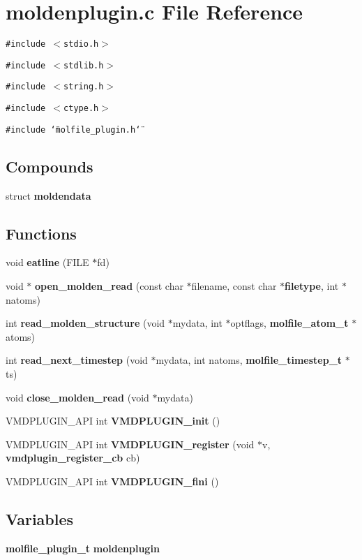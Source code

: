 \section{moldenplugin.c File Reference}
\label{moldenplugin_8c}
{\tt \#include $<$stdio.h$>$}\par
{\tt \#include $<$stdlib.h$>$}\par
{\tt \#include $<$string.h$>$}\par
{\tt \#include $<$ctype.h$>$}\par
{\tt \#include \char`\"{}molfile\_\-plugin.h\char`\"{}}\par
\subsection*{Compounds}
\begin{CompactItemize}
\item 
struct {\bf moldendata}
\end{CompactItemize}
\subsection*{Functions}
\begin{CompactItemize}
\item 
void {\bf eatline} (FILE $\ast$fd)
\item 
void $\ast$ {\bf open\_\-molden\_\-read} (const char $\ast$filename, const char $\ast${\bf filetype}, int $\ast$natoms)
\item 
int {\bf read\_\-molden\_\-structure} (void $\ast$mydata, int $\ast$optflags, {\bf molfile\_\-atom\_\-t} $\ast$atoms)
\item 
int {\bf read\_\-next\_\-timestep} (void $\ast$mydata, int natoms, {\bf molfile\_\-timestep\_\-t} $\ast$ts)
\item 
void {\bf close\_\-molden\_\-read} (void $\ast$mydata)
\item 
VMDPLUGIN\_\-API int {\bf VMDPLUGIN\_\-init} ()
\item 
VMDPLUGIN\_\-API int {\bf VMDPLUGIN\_\-register} (void $\ast$v, {\bf vmdplugin\_\-register\_\-cb} cb)
\item 
VMDPLUGIN\_\-API int {\bf VMDPLUGIN\_\-fini} ()
\end{CompactItemize}
\subsection*{Variables}
\begin{CompactItemize}
\item 
{\bf molfile\_\-plugin\_\-t} {\bf moldenplugin}
\end{CompactItemize}


